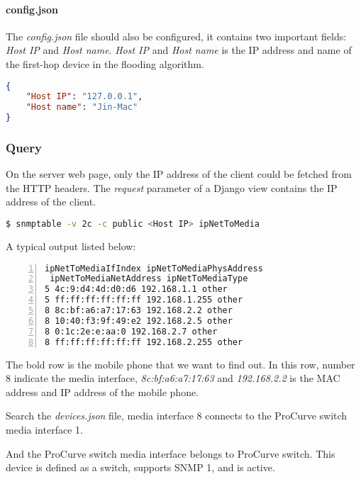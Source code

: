 \paragraph{config.json}

The \textit{config.json} file should also be configured, it contains two important fields: \textit{Host IP} and \textit{Host name}. \textit{Host IP} and \textit{Host name} is the IP address and name of the first-hop device in the flooding algorithm.

\begin{lstlisting}[language=json,firstnumber=1,caption={Code sample of \textit{config.json}}]
{
	"Host IP": "127.0.0.1",
	"Host name": "Jin-Mac"
}
\end{lstlisting}

\subsubsection{Query}

On the server web page, only the IP address of the client could be fetched from the HTTP headers. The \textit{request} parameter of a Django view contains the IP address of the client.



\begin{lstlisting}[language=bash, caption={List all connected devices}]
$ snmptable -v 2c -c public <Host IP> ipNetToMedia
\end{lstlisting}

A typical output listed below:

\begin{lstlisting}[numbers=left, firstnumber=1, numberfirstline=true]
ipNetToMediaIfIndex ipNetToMediaPhysAddress
 ipNetToMediaNetAddress ipNetToMediaType
5 4c:9:d4:4d:d0:d6 192.168.1.1 other
5 ff:ff:ff:ff:ff:ff 192.168.1.255 other
8 8c:bf:a6:a7:17:63 192.168.2.2 other
8 10:40:f3:9f:49:e2 192.168.2.5 other
8 0:1c:2e:e:aa:0 192.168.2.7 other
8 ff:ff:ff:ff:ff:ff 192.168.2.255 other
\end{lstlisting}

The bold row is the mobile phone that we want to find out. In this row, number 8 indicate the media interface, \textit{8c:bf:a6:a7:17:63} and \textit{192.168.2.2} is the MAC address and IP address of the mobile phone.

Search the \textit{devices.json} file, media interface 8 connects to the ProCurve switch media interface 1.

And the ProCurve switch media interface belongs to ProCurve switch. This device is defined as a switch, supports SNMP 1, and is active.


